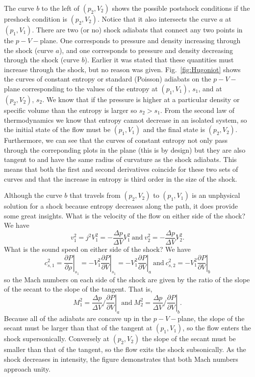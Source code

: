 The curve
$b$ to the left of $(p_2,V_2)$ shows the possible postshock conditions
if the preshock condition is $(p_2,V_2)$.  Notice that it also
intersects the curve $a$ at $(p_1,V_1)$.  There are two (or no) shock adiabats
that connect any two points in the $p-V-$plane.  One corresponds to
pressure and density increasing through the shock (curve $a$), and one
corresponds to pressure and density decreasing through the shock
(curve $b$).   Earlier it was stated that these quantities must
increase through the shock, but no reason was given.
Fig.~\ref{fig:Hugoniot} shows the curves of constant entropy
or standard (Poisson) adiabats on the $p-V-$plane corresponding to the
values of the entropy at $(p_1,V_1)$, $s_1$, and  at $(p_2,V_2)$,
$s_2$.   We know that if the pressure is higher at a particular
density or specific volume than the entropy is larger so $s_2>s_1$.
From the second law of thermodynamics we know that entropy cannot
decrease in an isolated system, so the initial state of the flow must
be $(p_1,V_1)$ and the final state is $(p_2,V_2)$.  Furthermore, we
can see that the curves of constant entropy not only pass through the
correponding plots in the plane (this is by design) but they are also
tangent to and have the same radius of curvature as the shock
adiabats.  This means that both the first and second derivatives
coincide for these two sets of curves and that the increase in entropy
is third order in the size of the shock.

Although the curve $b$ that travels from $(p_2,V_2)$ to $(p_1,V_1)$ is
an unphysical solution for a shock because entropy decreases along the
path, it does provide some great insights.  What is the velocity of
the flow on either side of the shock?  We have
\begin{equation}
v_1^2 = j^2 V_1^2 = -\frac{\Delta p}{\Delta V} V_1^2~\textrm{and}~
v_2^2 = -\frac{\Delta p}{\Delta V} V_2^2.
\label{eq:849}
\end{equation}
What is the sound speed on either side of the shock?  We have
\begin{equation}
c_{s,1}^2 = \left . \frac{\partial P}{\partial \rho} \right |_{s_1} =
-V_1^2 \left . \frac{\partial P}{\partial V} \right |_{s_1} = -V_1^2
\left . \frac{\partial P}{\partial V} \right
|_{a}~\textrm{and}~c_{s,2}^2 = -V_1^2
\left . \frac{\partial P}{\partial V} \right |_{b}
\label{eq:850}
\end{equation}
so the Mach numbers on each side of the shock are given by the ratio
of the slope of the secant to the slope of the tangent.  That is,
\begin{equation}
M_1^2 =\frac{\Delta p}{\Delta V} \Big / {\left . \frac{\partial
      P}{\partial V} \right |_{a}}~\textrm{and}~M_2^2 = {
  \frac{\Delta p}{\Delta V} } \Big / {\left . \frac{\partial P}{\partial V} \right |_{b}}.
\end{equation}
Because all of the adiabats are concave up in the $p-V-$plane, the
slope of the secant must be larger than that of the tangent at $(p_1,V_1)$, so
the flow enters the shock supersonically.  Conversely at $(p_2,V_2)$
the slope of the secant must be smaller than that of the tangent, so the
flow exits the shock subsonically.  As the shock decreases in
intensity, the figure demonstrates that both Mach numbers approach
unity.
 

